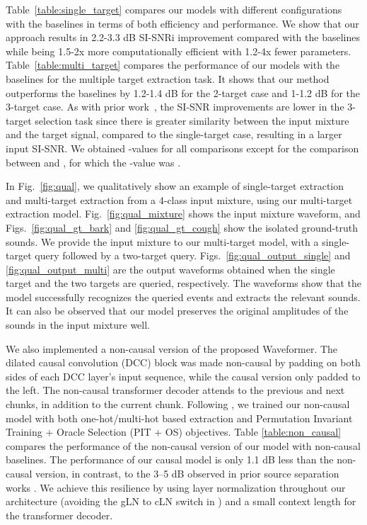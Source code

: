 Table~\ref{table:single_target} compares our models with different configurations with the baselines in terms of both efficiency and performance. We show that our approach  results in 2.2-3.3 dB SI-SNRi improvement compared with the baselines while being 1.5-2x more computationally efficient with 1.2-4x fewer parameters. Table~\ref{table:multi_target}  compares the performance of our models with the baselines for the multiple  target extraction task. It shows  that our method outperforms the baselines by 1.2-1.4 dB for the 2-target case and 1-1.2 dB for the 3-target case. As with prior work~\cite{2020arXiv200605712O}, the SI-SNR improvements are  lower in the 3-target selection task since there is greater similarity between the input mixture and the target signal, compared to the single-target  case, resulting in a larger input SI-SNR. {We obtained -values  for all comparisons except for the comparison between  and , for which the -value was .}



{
In Fig.~\ref{fig:qual}, we qualitatively show an example of single-target extraction and multi-target extraction from a 4-class input mixture, using our multi-target extraction model. Fig.~\ref{fig:qual_mixture} shows the input mixture waveform, and Figs.~\ref{fig:qual_gt_bark} and \ref{fig:qual_gt_cough} show the isolated ground-truth sounds. We provide the input mixture to our multi-target model, with a single-target query followed by a two-target query. Figs.~\ref{fig:qual_output_single} and \ref{fig:qual_output_multi} are the output waveforms obtained when the single target and the two targets are queried, respectively. The waveforms show that the model successfully recognizes the queried events and extracts the relevant sounds. It can also be observed that our model preserves the original amplitudes of the sounds in the input mixture well.
}



{We also implemented a non-causal version of the proposed Waveformer. The dilated causal convolution (DCC) block was made non-causal by padding on both sides of each DCC layer’s input sequence, while the causal version only padded to the left. The non-causal transformer decoder attends to the previous and next chunks, in addition to the current chunk. Following \cite{2020arXiv200605712O}, we trained our non-causal model with both one-hot/multi-hot based extraction and Permutation Invariant Training + Oracle Selection (PIT + OS) objectives.  Table \ref{table:non_causal} compares the performance of the non-causal version of our model with non-causal baselines. The performance of our causal model is only 1.1 dB less than the non-causal version, in contrast, to the 3--5 dB observed in prior source separation works \cite{luo2019conv, subakan2022resource}. We achieve this resilience by using layer normalization throughout our architecture (avoiding the gLN to cLN switch in \cite{luo2019conv,subakan2022resource}) and a small context length for the transformer decoder.}













